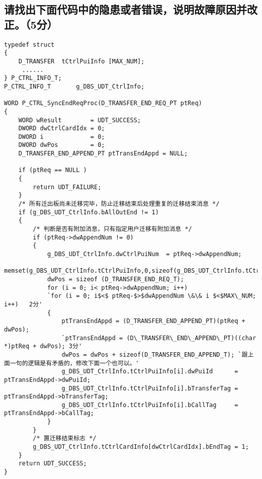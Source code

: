 ﻿\documentclass  [11pt,onecolumn,a4paper]{article}
\begin{document}
\subsection{请找出下面代码中的隐患或者错误，说明故障原因并改正。（5分）}
\begin{lstlisting}[escapeinside=`']
typedef struct
{  
	D_TRANSFER  tCtrlPuiInfo [MAX_NUM];
     ......
} P_CTRL_INFO_T;
P_CTRL_INFO_T       g_DBS_UDT_CtrlInfo;

WORD P_CTRL_SyncEndReqProc(D_TRANSFER_END_REQ_PT ptReq)
{
    WORD wResult        = UDT_SUCCESS;
    DWORD dwCtrlCardIdx = 0;
    DWORD i             = 0;
    DWORD dwPos         = 0; 
    D_TRANSFER_END_APPEND_PT ptTransEndAppd = NULL;
   
    if (ptReq == NULL )
    {
        return UDT_FAILURE;
    }
    /* 所有迁出板尚未迁移完毕，防止迁移结束后处理重复的迁移结束消息 */
    if (g_DBS_UDT_CtrlInfo.bAllOutEnd != 1)
    {       
        /* 判断是否有附加消息，只有指定用户迁移有附加消息 */
        if (ptReq->dwAppendNum != 0)
        {
            g_DBS_UDT_CtrlInfo.dwCtrlPuiNum  = ptReq->dwAppendNum;
            memset(g_DBS_UDT_CtrlInfo.tCtrlPuiInfo,0,sizeof(g_DBS_UDT_CtrlInfo.tCtrlPuiInfo));
            dwPos = sizeof (D_TRANSFER_END_REQ_T);
            for (i = 0; i< ptReq->dwAppendNum; i++)
            `for (i = 0; i$<$ ptReq-$>$dwAppendNum \&\& i $<$MAX\_NUM; i++)   2分'
            {
                ptTransEndAppd = (D_TRANSFER_END_APPEND_PT)(ptReq + dwPos); 
                `ptTransEndAppd = (D\_TRANSFER\_END\_APPEND\_PT)((char *)ptReq + dwPos); 3分'
                dwPos = dwPos + sizeof(D_TRANSFER_END_APPEND_T); `跟上面一句的逻辑是有矛盾的，修改下面一个也可以。'
                g_DBS_UDT_CtrlInfo.tCtrlPuiInfo[i].dwPuiId      = ptTransEndAppd->dwPuiId;
                g_DBS_UDT_CtrlInfo.tCtrlPuiInfo[i].bTransferTag = ptTransEndAppd->bTransferTag;
                g_DBS_UDT_CtrlInfo.tCtrlPuiInfo[i].bCallTag     = ptTransEndAppd->bCallTag;
            }
        }       
        /* 置迁移结束标志 */
        g_DBS_UDT_CtrlInfo.tCtrlCardInfo[dwCtrlCardIdx].bEndTag = 1;   
    }      
    return UDT_SUCCESS;
}
\end{lstlisting}
\end{document}
